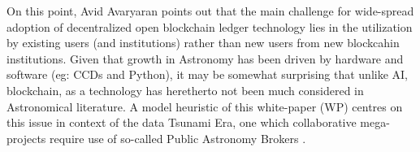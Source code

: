 \documentclass[final,5p,times,twocolumn,authoryear]{elsarticle}
\begin{document}
On this point, Avid Avaryaran points out that the main challenge for wide-spread adoption of decentralized open blockchain ledger technology lies in the utilization by existing users (and institutions) rather than new users from new blockcahin institutions. Given that growth in Astronomy has been driven by hardware and software (eg: CCDs and Python), it may be somewhat surprising that unlike AI, blockchain, as a technology has heretherto not been much considered in Astronomical literature.  A model heuristic of this white-paper (WP) centres on this issue in context of the data Tsunami Era, one which collaborative mega-projects require use of so-called Public Astronomy Brokers \cite{bellm19}.  


\end{document}
